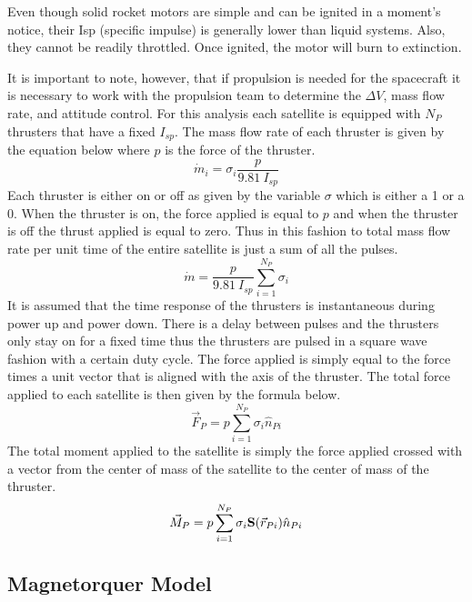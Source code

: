 \documentclass{article}
\begin{document}
Even though solid rocket motors are simple and can be ignited in a
moment's notice, their Isp  (specific impulse) is generally lower than
liquid systems. Also, they cannot be readily throttled. Once ignited,
the motor will burn to extinction\cite{qp9}. 

It is important to note, however, that if propulsion is needed for the
spacecraft it is necessary to work with the propulsion team to
determine the $\Delta V$,  mass flow rate, and attitude control. For
this analysis each satellite is equipped with $N_P$ thrusters that have a fixed
$I_{sp}$. The mass flow rate of each thruster is given by the equation
below where $p$ is the force of the thruster.
\begin{equation}
  \dot{m}_i = \sigma_i\frac{p}{9.81~I_{sp}}
\end{equation}
Each thruster is either on or off as given by the variable $\sigma$
which is either a 1 or a 0. When the thruster is on, the force
applied is equal to $p$ and when the thruster is off the thrust
applied is equal to zero. Thus in this fashion to total mass flow rate
per unit time of the entire satellite is just a sum of all the pulses.
\begin{equation}
  \dot{m} = \frac{p}{9.81~I_{sp}}\sum\limits_{i=1}^{N_P}\sigma_i
\end{equation}
It is assumed that the time response of the
thrusters is instantaneous during power up and power down. There is a
delay between pulses and the thrusters only stay on for a fixed time
thus the thrusters are pulsed in a square wave fashion with a certain
duty cycle. The force applied is simply equal to the force times a
unit vector that is aligned with the axis of the thruster. The total
force applied to each satellite is then given by the formula below.
\begin{equation}
  \vec{F}_P = p\sum\limits_{i=1}^{N_P}\sigma_i\hat{n}_{Pi}
\end{equation}
The total moment applied to the satellite is simply the force applied
crossed with a vector from the center of mass of the satellite to the
center of mass of the thruster.
\begin{equation}\label{e:propulsion}
  \vec{M}_P = p\sum\limits_{i=1}^{N_P}\sigma_i{\bf S}(\vec{r}_{Pi})\hat{n}_{Pi}
\end{equation}

\subsection{Magnetorquer Model}
\end{document}
